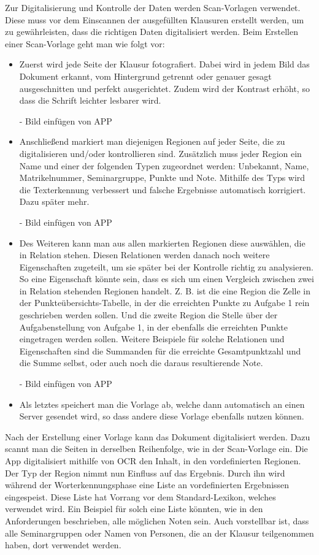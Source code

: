 \documentclass[nomenclature, oneside, 150]{HSMW-Thesis}
\begin{document}
	Zur Digitalisierung und Kontrolle der Daten werden Scan-Vorlagen verwendet. Diese muss vor dem Einscannen der ausgefüllten Klausuren erstellt werden, um zu gewährleisten, dass die richtigen Daten digitalisiert werden. Beim Erstellen einer Scan-Vorlage geht man wie folgt vor:
	\begin{itemize}
		\item Zuerst wird jede Seite der Klausur fotografiert. Dabei wird in jedem Bild das Dokument erkannt, vom Hintergrund getrennt oder genauer gesagt ausgeschnitten und perfekt ausgerichtet. Zudem wird der Kontrast erhöht, so dass die Schrift leichter lesbarer wird.
		
			- Bild einfügen von APP
		
		\item Anschließend markiert man diejenigen Regionen auf jeder Seite, die zu digitalisieren und/oder kontrollieren sind. Zusätzlich muss jeder Region ein Name und einer der folgenden Typen zugeordnet werden: Unbekannt, Name, Matrikelnummer, Seminargruppe, Punkte und Note. Mithilfe des Typs wird die Texterkennung verbessert und falsche Ergebnisse automatisch korrigiert. Dazu später mehr.
		
			- Bild einfügen von APP
			
		\item Des Weiteren kann man aus allen markierten Regionen diese auswählen, die in Relation stehen. Diesen Relationen werden danach noch weitere Eigenschaften zugeteilt, um sie später bei der Kontrolle richtig zu analysieren. So eine Eigenschaft könnte sein, dass es sich um einen Vergleich zwischen zwei in Relation stehenden Regionen handelt. Z. B. ist die eine Region die Zelle in der Punkteübersichts-Tabelle, in der die erreichten Punkte zu Aufgabe 1 rein geschrieben werden sollen. Und die zweite Region die Stelle über der Aufgabenstellung von Aufgabe 1, in der ebenfalls die erreichten Punkte eingetragen werden sollen. Weitere Beispiele für solche Relationen und Eigenschaften sind die Summanden für die erreichte Gesamtpunktzahl und die Summe selbst, oder auch noch die daraus resultierende Note.
		
			- Bild einfügen von APP
		
		\item Als letztes speichert man die Vorlage ab, welche dann automatisch an einen Server gesendet wird, so dass andere diese Vorlage ebenfalls nutzen können.
	\end{itemize}
	
	Nach der Erstellung einer Vorlage kann das Dokument digitalisiert werden. Dazu scannt man die Seiten in derselben Reihenfolge, wie in der Scan-Vorlage ein. Die App digitalisiert mithilfe von OCR den Inhalt, in den vordefinierten Regionen. Der Typ der Region nimmt nun Einfluss auf das Ergebnis. Durch ihn wird während der Worterkennungsphase eine Liste an vordefinierten Ergebnissen eingespeist. Diese Liste hat Vorrang vor dem Standard-Lexikon, welches verwendet wird. Ein Beispiel für solch eine Liste könnten, wie in den Anforderungen beschrieben, alle möglichen Noten sein. Auch vorstellbar ist, dass alle Seminargruppen oder Namen von Personen, die an der Klausur teilgenommen haben, dort verwendet werden. 
	
\end{document}
